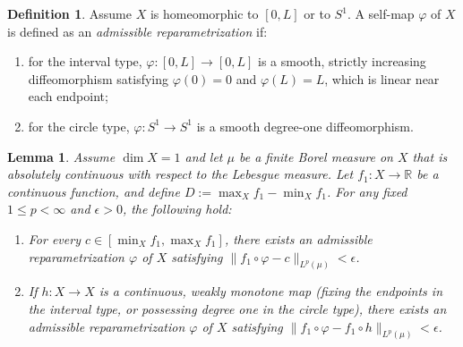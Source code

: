 \documentclass[12pt,a4paper]{amsart}
\theoremstyle{plain}
\newtheorem{lemma}[theorem]{Lemma}
\theoremstyle{definition}
\newtheorem{definition}[theorem]{Definition}
\theoremstyle{remark}
\begin{document}
\begin{definition}\label{def:admissible}
Assume $X$ is homeomorphic to $[0,L]$ or to $S^1$. A self-map $\varphi$ of $X$ is defined as an \emph{admissible reparametrization} if:
\begin{enumerate}[label=\textup{(\roman*)}, font=\upshape]
  \item for the interval type, $\varphi \colon [0,L] \to [0,L]$ is a smooth, strictly increasing diffeomorphism satisfying $\varphi(0)=0$ and $\varphi(L)=L$, which is linear near each endpoint;
  \item for the circle type, $\varphi \colon S^1 \to S^1$ is a smooth degree-one diffeomorphism.
\end{enumerate}
\end{definition}

\begin{lemma}\label{lem:onedimapprox}
Assume $\dim X = 1$ and let $\mu$ be a finite Borel measure on $X$ that is absolutely continuous with respect to the Lebesgue measure. Let $f_1 \colon X \to \mathbb{R}$ be a continuous function, and define $D := \max_X f_1 - \min_X f_1$. For any fixed $1 \le p < \infty$ and $\epsilon > 0$, the following hold:
\begin{enumerate}[label=\textup{(\arabic*)}, font=\upshape]
  \item For every $c \in [\min_X f_1, \max_X f_1]$, there exists an admissible reparametrization $\varphi$ of $X$ satisfying $\|f_1 \circ \varphi - c\|_{L^p(\mu)} < \epsilon$.
  \item If $h \colon X \to X$ is a continuous, weakly monotone map (fixing the endpoints in the interval type, or possessing degree one in the circle type), there exists an admissible reparametrization $\varphi$ of $X$ satisfying $\|f_1 \circ \varphi - f_1 \circ h\|_{L^p(\mu)} < \epsilon$.
\end{enumerate}
\end{lemma}
\end{document}
